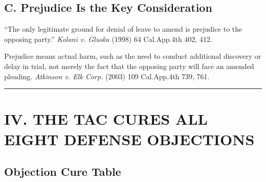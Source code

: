 \subsection{C. Prejudice Is the Key Consideration}\label{c.-prejudice-is-the-key-consideration}

``The only legitimate ground for denial of leave to amend is prejudice to the opposing party.'' \emph{Kolani v. Gluska} (1998) 64 Cal.App.4th 402, 412.

Prejudice means actual harm, such as the need to conduct additional discovery or delay in trial, not merely the fact that the opposing party will face an amended pleading. \emph{Atkinson v. Elk Corp.} (2003) 109 Cal.App.4th 739, 761.

\begin{center}\rule{0.5\linewidth}{0.5pt}\end{center}

\label{toc:iv-the-tac-cures-all-eight-defense-objections}
\section{IV. THE TAC CURES ALL EIGHT DEFENSE OBJECTIONS}\label{iv.-the-tac-cures-all-eight-defense-objections}

\subsection{Objection {\textrightarrow{}} Cure Table}\label{objection-cure-table}

